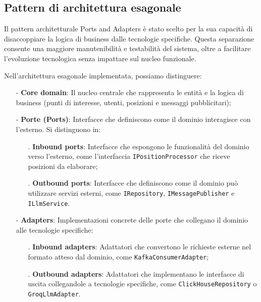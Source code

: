 \documentclass[10pt]{article}
\begin{document}
    \subsection{Pattern di architettura esagonale}
    
    Il pattern architetturale Ports and Adapters è stato scelto per la sua capacità di disaccoppiare la logica di business dalle tecnologie specifiche. Questa separazione consente una maggiore manutenibilità e testabilità del sistema, oltre a facilitare l'evoluzione tecnologica senza impattare sul nucleo funzionale.
    
    Nell'architettura esagonale implementata, possiamo distinguere:
    
    \begin{itemize}
        \item[-] \textbf{Core domain}: Il nucleo centrale che rappresenta le entità e la logica di business (punti di interesse, utenti, posizioni e messaggi pubblicitari);
        \item[-] \textbf{Porte (Ports)}: Interfacce che definiscono come il dominio interagisce con l'esterno. Si distinguono in:
        \begin{itemize}
            \item[.] \textbf{Inbound ports}: Interfacce che espongono le funzionalità del dominio verso l'esterno, come l'interfaccia \texttt{IPositionProcessor} che riceve posizioni da elaborare;
            \item[.] \textbf{Outbound ports}: Interfacce che definiscono come il dominio può utilizzare servizi esterni, come \texttt{IRepository}, \texttt{IMessagePublisher} e \texttt{ILlmService}.
        \end{itemize}
        \item[-] \textbf{Adapters}: Implementazioni concrete delle porte che collegano il dominio alle tecnologie specifiche:
        \begin{itemize}
            \item[.] \textbf{Inbound adapters}: Adattatori che convertono le richieste esterne nel formato atteso dal dominio, come \texttt{KafkaConsumerAdapter};
            \item[.] \textbf{Outbound adapters}: Adattatori che implementano le interfacce di uscita collegandole a tecnologie specifiche, come \texttt{ClickHouseRepository} o \texttt{GroqLlmAdapter}.
        \end{itemize}
    \end{itemize}
\end{document}
